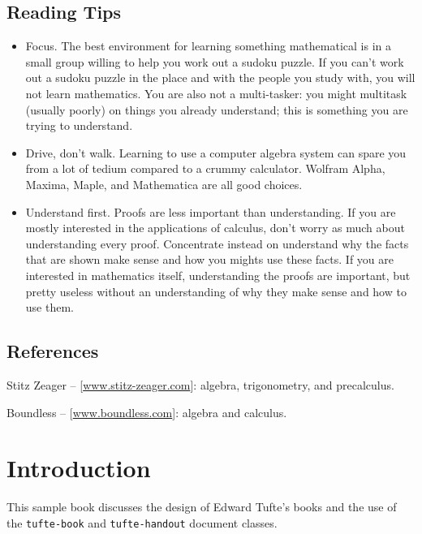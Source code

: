 \documentclass{tufte-book} %
\newcommand{\doccls}[1]{\texttt{#1}}
\begin{document}
\section*{Reading Tips}
\begin{itemize}
\item Focus. The best environment for learning something mathematical is in a small group willing to help you work out a sudoku puzzle.  If you can't work out a sudoku puzzle in the place and with the people you study with, you will not learn mathematics.  You are also not a multi-tasker: you might multitask (usually poorly) on things you already understand; this is something you are trying to understand.
\item Drive, don't walk. Learning to use a computer algebra system can spare you from a lot of tedium compared to a crummy calculator.  Wolfram Alpha, Maxima, Maple, and Mathematica are all good choices.
\item Understand first. Proofs are less important than understanding.  If you are mostly interested in the applications of calculus, don't worry as much about understanding every proof.  Concentrate instead on understand why the facts that are shown make sense and how you mights use these facts.  If you are interested in mathematics itself, understanding the proofs are important, but pretty useless without an understanding of why they make sense and how to use them.
\end{itemize}
\section*{References}

Stitz Zeager -- [\url{www.stitz-zeager.com}]: algebra, trigonometry, and precalculus.

Boundless -- [\url{www.boundless.com}]: algebra and calculus.

\chapter*{Introduction} %

This sample book discusses the design of Edward Tufte's books\cite{Tufte2001,Tufte1990,Tufte1997,Tufte2006} and the use of the \doccls{tufte-book} and \doccls{tufte-handout} document classes.

\end{document}
